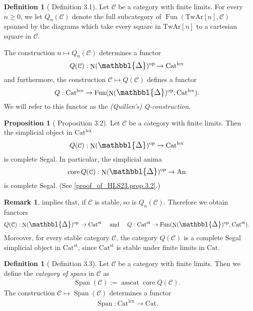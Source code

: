 \documentclass[a4paper,dvipdfmx,11pt,reqno]{amsart}
\DeclareMathOperator{\myop}{op}
\DeclareMathOperator{\N}{N}
\DeclareMathOperator{\Fun}{Fun}
\newcommand{\C}{\mathcal{C}}
\DeclareMathOperator{\core}{core}
\DeclareMathOperator{\asscat}{asscat}
\DeclareMathOperator{\Span}{Span}
\newcommand{\An}{\mathrm{An}}
\newcommand{\Cat}{\mathrm{Cat}}
\newcommand{\Catlex}{\mathrm{Cat^{lex}}}
\newcommand{\Catst}{\mathrm{Cat^{st}}}
\newcommand{\TwAr}{\mathrm{TwAr}}
\newcommand{\prism}{{\mathlarger{\mathbbl{\Delta}}}}
\theoremstyle{definition}
\newtheorem{definition}[theorem]{Definition}
\newtheorem{proposition}[theorem]{Proposition}
\newtheorem{remark}[theorem]{Remark}
\begin{document}
\begin{definition}[\cite{HLS23} Definition 3.1] \label{HLS23.def.3.1}
  Let $\C$ be a category with finite limits.
  For every $n \geq 0$, we let $Q_{n}(\C)$ denote the full subcategory of $\Fun(\TwAr[n],\C)$ spanned by the diagrams which take every square in $\TwAr[n]$ to a cartesian square in $\C$.

  The construction $n \mapsto Q_{n}(\C)$ determines a functor 
  \begin{align*}
    Q(\C) : \N(\prism)^{\myop} \to \Catlex
  \end{align*}
  and furthermore, the construction $\C \mapsto Q(\C)$ defines a functor 
  \begin{align*}
    Q : \Catlex \to \Fun(\N(\prism)^{\myop},\Catlex).
  \end{align*}
  We will refer to this functor as the \textit{(Quillen's) Q-construction}.
\end{definition}

\begin{proposition}[\cite{HLS23} Proposition 3.2] \label{HLS23.prop.3.2}
  Let $\C$ be a category with finite limits.
  Then the simplicial object in $\Catlex$
  \begin{align*}
    Q(\C) : \N(\prism)^{\myop} \to \Catlex
  \end{align*}
  is complete Segal.
  In particular, the simplicial anima 
  \begin{align*}
    \core Q(\C) : \N(\prism)^{\myop} \to \An
  \end{align*}
  is complete Segal.
  (See \cref{proof_of_HLS23.prop.3.2}.)
\end{proposition}

\begin{remark} \label{Ber.rem.4.32}
   implies that, if $\C$ is stable, so is $Q_n(\C)$.
  Therefore we obtain functors
  \begin{align*}
    Q(\C) : \N(\prism)^{\myop} \to \Catst 
    \quad \text{ and } \quad 
    Q : \Catst \to \Fun(\N(\prism)^{\myop},\Catst).
  \end{align*}
  Moreover, for every stable category $\C$, the category $Q(\C)$ is a complete Segal simplicial object in $\Catst$, since $\Catst$ is stable under finite limits in $\Cat$.
\end{remark}

\begin{definition}[\cite{HLS23} Definition 3.3] \label{HLS23.def.3.3}
  Let $\C$ be a category with finite limits.
  Then we define the \textit{category of spans} in $\C$ as 
  \begin{align*}
    \Span(\C) := \asscat \core Q(\C).
  \end{align*}
  The construction $\C \mapsto \Span(\C)$ determines a functor 
  \begin{align*}
    \Span : \Catlex \to \Cat.
  \end{align*}
\end{definition}
\end{document}
